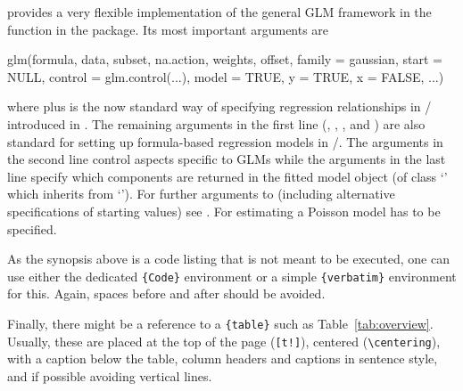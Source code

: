 \documentclass[article]{jss}
\newcommand{\class}[1]{`\code{#1}'}
\newcommand{\fct}[1]{\code{#1()}}
\begin{document}
 provides a very flexible implementation of the general GLM
framework in the function \fct{glm} \citep{Chambers+Hastie:1992} in the
 package. Its most important arguments are
\begin{Code}
glm(formula, data, subset, na.action, weights, offset,
  family = gaussian, start = NULL, control = glm.control(...),
  model = TRUE, y = TRUE, x = FALSE, ...)
\end{Code}
where  plus  is the now standard way of specifying
regression relationships in / introduced in
\cite{Chambers+Hastie:1992}. The remaining arguments in the first line
(, , , and ) are also
standard  for setting up formula-based regression models in
/. The arguments in the second line control aspects
specific to GLMs while the arguments in the last line specify which components
are returned in the fitted model object (of class \class{glm} which inherits
from \class{lm}). For further arguments to \fct{glm} (including alternative
specifications of starting values) see . For estimating a Poisson
model  has to be specified.

\begin{leftbar}
As the synopsis above is a code listing that is not meant to be executed,
one can use either the dedicated \verb|{Code}| environment or a simple
\verb|{verbatim}| environment for this. Again, spaces before and after should be
avoided.

Finally, there might be a reference to a \verb|{table}| such as
Table~\ref{tab:overview}. Usually, these are placed at the top of the page
(\verb|[t!]|), centered (\verb|\centering|), with a caption below the table,
column headers and captions in sentence style, and if possible avoiding vertical
lines.
\end{leftbar}
\end{document}
